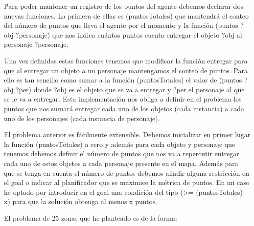 \documentclass[12pt,a4paper]{article}
\begin{document}
Para poder mantener un registro de los puntos del agente debemos declarar dos nuevas funciones. La primera de ellas es (puntosTotales) que mantendrá el conteo del número de puntos que lleva el agente por el momento y la función (puntos ?obj ?personaje) que nos indica cuántos puntos cuenta entregar el objeto ?obj al personaje ?personaje.

Una vez definidas estas funciones tenemos que modificar la función entregar para que al entregar un objeto a un personaje mantengamos el conteo de puntos. Para ello es tan sencillo como sumar a la función (puntosTotales) el valor de (puntos ?obj ?per) donde ?obj es el objeto que se va a entregar y ?per el personaje al que se le va a entregar. Esta implementación nos obliga a definir en el problema los puntos que nos sumará entregar cada uno de los objetos (cada instancia) a cada uno de los personajes (cada instancia de personaje).

El problema anterior es fácilmente extensible. Debemos inicializar en primer lugar la función (puntosTotales) a cero y además para cada objeto y personaje que tenemos debemos definir el número de puntos que nos va a repercutir entregar cada uno de estos objetos a cada personaje presente en el mapa. Además para que se tenga en cuenta el número de puntos debemos añadir alguna restricción en el goal o indicar al planificador que se maximice la métrica de puntos. En mi caso he optado por introducir en el goal una condición del tipo (>= (puntosTotales) x) para que la solución obtenga al menos x puntos.

El problema de 25 zonas que he planteado es de la forma:



\end{document}
